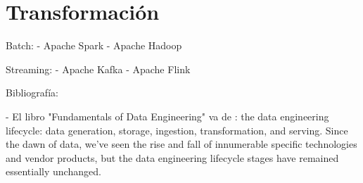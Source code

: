 \documentclass[12pt]{book}
\begin{document}
\section{Transformación}

Batch:
- Apache Spark
- Apache Hadoop

Streaming:
- Apache Kafka
- Apache Flink



Bibliografía: 

- El libro "Fundamentals of Data Engineering" va de : the data engineering lifecycle: data generation, storage, ingestion, transformation, and serving. Since the dawn of data, we've seen the rise and fall of innumerable specific technologies and vendor products, but the data engineering lifecycle stages have remained essentially unchanged. 
\end{document}
